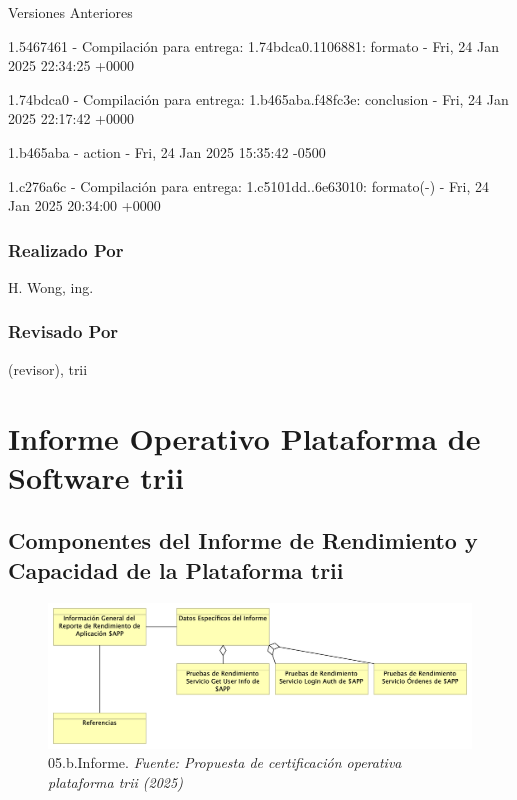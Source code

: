 \documentclass[
  paper=a4,
  ,captions=tableheading
]{scrartcl}
\renewenvironment{quote}{\begin{customblockquote}\list{}{\rightmargin=0em\leftmargin=0em}%
\item\relax\color{blockquote-text}\ignorespaces}{\unskip\unskip\endlist\end{customblockquote}}
\begin{document}
Versiones Anteriores

1.5467461 - Compilación para entrega: 1.74bdca0.1106881: formato - Fri,
24 Jan 2025 22:34:25 +0000

1.74bdca0 - Compilación para entrega: 1.b465aba.f48fc3e: conclusion -
Fri, 24 Jan 2025 22:17:42 +0000

1.b465aba - action - Fri, 24 Jan 2025 15:35:42 -0500

1.c276a6c - Compilación para entrega: 1.c5101dd..6e63010: formato(-) -
Fri, 24 Jan 2025 20:34:00 +0000

\subsubsection{Realizado Por}\label{sec:realizado-por}

H. Wong, ing.

\subsubsection{Revisado Por}\label{sec:revisado-por}

(revisor), trii

\newpage

\section{Informe Operativo Plataforma de Software
trii}\label{sec:informe-operativo-plataforma-de-software-trii}

\subsection{Componentes del Informe de Rendimiento y Capacidad de la
Plataforma
trii}\label{sec:componentes-del-informe-de-rendimiento-y-capacidad-de-la-plataforma-trii}

\begin{quote}
\end{quote}

\begin{figure}
\centering
\includegraphics{images/05.b.Informe.png}
\caption{05.b.Informe. \emph{Fuente: Propuesta de certificación
operativa plataforma trii
(2025)}}\label{fig:id-04abc8f16f354757a52791da825e4049}
\end{figure}
\end{document}
